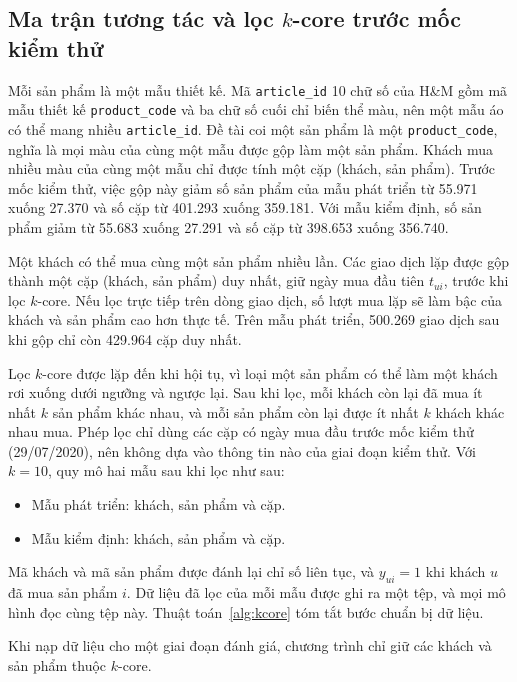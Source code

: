 \subsection{Ma trận tương tác và lọc \texorpdfstring{$k$}{k}-core trước mốc kiểm thử}
\label{subsec:interaction_matrix}

Mỗi sản phẩm là một mẫu thiết kế. Mã \texttt{article\_id} 10 chữ số của H\&M gồm mã mẫu thiết kế \texttt{product\_code} và ba chữ số cuối chỉ biến thể màu, nên một mẫu áo có thể mang nhiều \texttt{article\_id}. Đề tài coi một sản phẩm là một \texttt{product\_code}, nghĩa là mọi màu của cùng một mẫu được gộp làm một sản phẩm. Khách mua nhiều màu của cùng một mẫu chỉ được tính một cặp (khách, sản phẩm). Trước mốc kiểm thử, việc gộp này giảm số sản phẩm của mẫu phát triển từ 55.971 xuống 27.370 và số cặp từ 401.293 xuống 359.181. Với mẫu kiểm định, số sản phẩm giảm từ 55.683 xuống 27.291 và số cặp từ 398.653 xuống 356.740.

Một khách có thể mua cùng một sản phẩm nhiều lần. Các giao dịch lặp được gộp thành một cặp (khách, sản phẩm) duy nhất, giữ ngày mua đầu tiên $t_{ui}$, trước khi lọc $k$-core. Nếu lọc trực tiếp trên dòng giao dịch, số lượt mua lặp sẽ làm bậc của khách và sản phẩm cao hơn thực tế. Trên mẫu phát triển, 500.269 giao dịch sau khi gộp chỉ còn 429.964 cặp duy nhất.

Lọc $k$-core được lặp đến khi hội tụ, vì loại một sản phẩm có thể làm một khách rơi xuống dưới ngưỡng và ngược lại. Sau khi lọc, mỗi khách còn lại đã mua ít nhất $k$ sản phẩm khác nhau, và mỗi sản phẩm còn lại được ít nhất $k$ khách khác nhau mua. Phép lọc chỉ dùng các cặp có ngày mua đầu trước mốc kiểm thử (29/07/2020), nên không dựa vào thông tin nào của giai đoạn kiểm thử. Với $k = 10$, quy mô hai mẫu sau khi lọc như sau:
\begin{itemize}
    \item Mẫu phát triển:  khách,  sản phẩm và  cặp.
    \item Mẫu kiểm định:  khách,  sản phẩm và  cặp.
\end{itemize}

Mã khách và mã sản phẩm được đánh lại chỉ số liên tục, và $y_{ui} = 1$ khi khách $u$ đã mua sản phẩm $i$. Dữ liệu đã lọc của mỗi mẫu được ghi ra một tệp, và mọi mô hình đọc cùng tệp này. Thuật toán~\ref{alg:kcore} tóm tắt bước chuẩn bị dữ liệu.

Khi nạp dữ liệu cho một giai đoạn đánh giá, chương trình chỉ giữ các khách và sản phẩm thuộc $k$-core.

